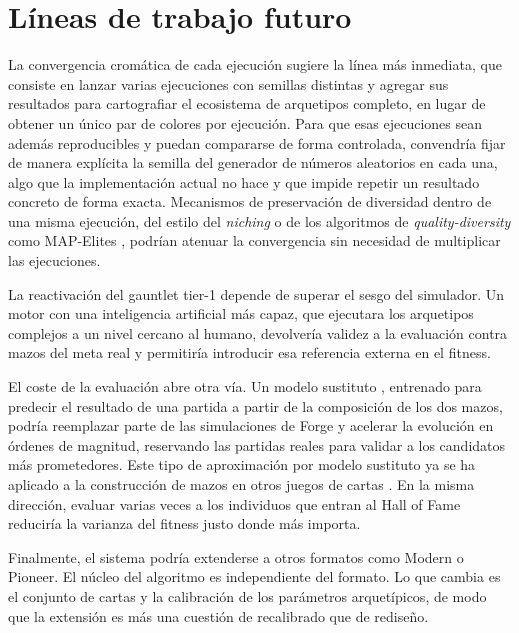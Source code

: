 \section{Líneas de trabajo futuro}

La convergencia cromática de cada ejecución sugiere la línea más inmediata, que consiste en lanzar varias ejecuciones con semillas distintas y agregar sus resultados para cartografiar el ecosistema de arquetipos completo, en lugar de obtener un único par de colores por ejecución. Para que esas ejecuciones sean además reproducibles y puedan compararse de forma controlada, convendría fijar de manera explícita la semilla del generador de números aleatorios en cada una, algo que la implementación actual no hace y que impide repetir un resultado concreto de forma exacta. Mecanismos de preservación de diversidad dentro de una misma ejecución, del estilo del \emph{niching} \cite{mahfoud1995} o de los algoritmos de \emph{quality-diversity} como MAP-Elites \cite{mouret2015, pugh2016}, podrían atenuar la convergencia sin necesidad de multiplicar las ejecuciones.

La reactivación del gauntlet tier-1 depende de superar el sesgo del simulador. Un motor con una inteligencia artificial más capaz, que ejecutara los arquetipos complejos a un nivel cercano al humano, devolvería validez a la evaluación contra mazos del meta real y permitiría introducir esa referencia externa en el fitness.

El coste de la evaluación abre otra vía. Un modelo sustituto \cite{jin2011}, entrenado para predecir el resultado de una partida a partir de la composición de los dos mazos, podría reemplazar parte de las simulaciones de Forge y acelerar la evolución en órdenes de magnitud, reservando las partidas reales para validar a los candidatos más prometedores. Este tipo de aproximación por modelo sustituto ya se ha aplicado a la construcción de mazos en otros juegos de cartas \cite{zhang2022}. En la misma dirección, evaluar varias veces a los individuos que entran al Hall of Fame reduciría la varianza del fitness justo donde más importa.

Finalmente, el sistema podría extenderse a otros formatos como Modern o Pioneer. El núcleo del algoritmo es independiente del formato. Lo que cambia es el conjunto de cartas y la calibración de los parámetros arquetípicos, de modo que la extensión es más una cuestión de recalibrado que de rediseño.
